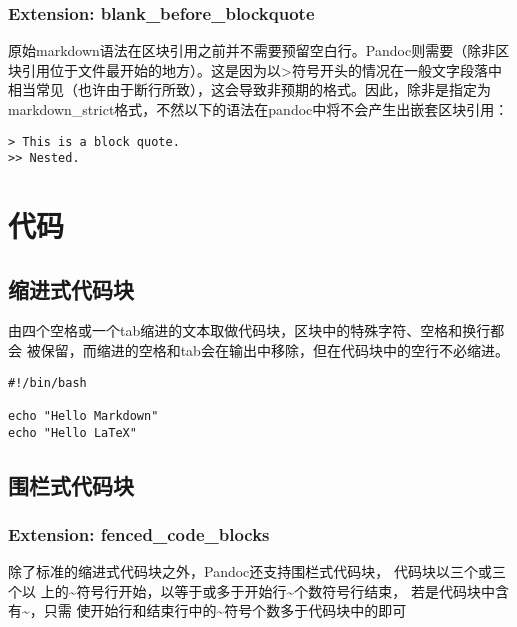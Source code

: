 \documentclass[fancyhdr,bookmark]{ctexbook}
\begin{document}
\hypertarget{extension-blank_before_blockquote}{%
\subsubsection{Extension:
blank\_before\_blockquote}\label{extension-blank_before_blockquote}}

原始markdown语法在区块引用之前并不需要预留空白行。Pandoc则需要（除非区
块引用位于文件最开始的地方）。这是因为以\textgreater 符号开头的情况在一般文字段落中
相当常见（也许由于断行所致），这会导致非预期的格式。因此，除非是指定为
markdown\_strict格式，不然以下的语法在pandoc中将不会产生出嵌套区块引用：

\begin{lstlisting}
> This is a block quote.
>> Nested.
\end{lstlisting}

\hypertarget{ux4ee3ux7801}{%
\section{代码}\label{ux4ee3ux7801}}

\hypertarget{ux7f29ux8fdbux5f0fux4ee3ux7801ux5757}{%
\subsection{缩进式代码块}\label{ux7f29ux8fdbux5f0fux4ee3ux7801ux5757}}

由四个空格或一个tab缩进的文本取做代码块，区块中的特殊字符、空格和换行都会
被保留，而缩进的空格和tab会在输出中移除，但在代码块中的空行不必缩进。

\begin{lstlisting}
#!/bin/bash

echo "Hello Markdown"
echo "Hello LaTeX"
\end{lstlisting}

\hypertarget{ux56f4ux680fux5f0fux4ee3ux7801ux5757}{%
\subsection{围栏式代码块}\label{ux56f4ux680fux5f0fux4ee3ux7801ux5757}}

\hypertarget{extension-fenced_code_blocks}{%
\subsubsection{Extension:
fenced\_code\_blocks}\label{extension-fenced_code_blocks}}

除了标准的缩进式代码块之外，Pandoc还支持围栏式代码块，
代码块以三个或三个以
上的\textasciitilde 符号行开始，以等于或多于开始行\textasciitilde 个数符号行结束，
若是代码块中含有\textasciitilde，只需
使开始行和结束行中的\textasciitilde 符号个数多于代码块中的即可
\end{document}
